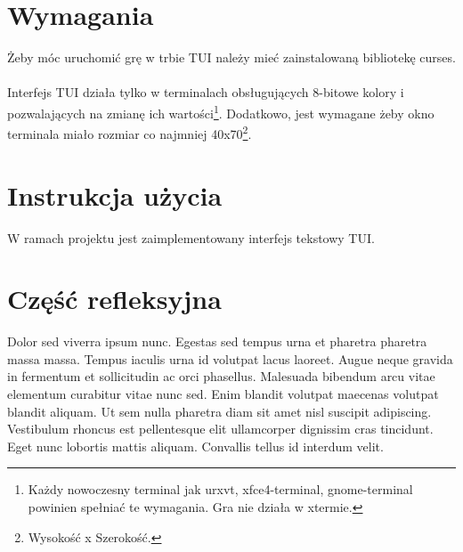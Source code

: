 \documentclass[12pt, titlepage]{article}
\begin{document}
\section{Wymagania}
Żeby móc uruchomić grę w trbie TUI należy mieć zainstalowaną
bibliotekę curses.
\\~\\
Interfejs TUI działa tylko w terminalach obsługujących 8-bitowe
kolory i pozwalających na zmianę ich wartości\footnote{Każdy nowoczesny terminal jak urxvt, xfce4-terminal, gnome-terminal powinien spełniać te wymagania. Gra nie działa w xtermie.}.
Dodatkowo, jest wymagane żeby okno terminala miało rozmiar co
najmniej 40x70\footnote{Wysokość x Szerokość.}.

\section{Instrukcja użycia}
W ramach projektu jest zaimplementowany interfejs tekstowy TUI.


\section{Część refleksyjna}
Dolor sed viverra ipsum nunc. Egestas sed tempus urna et pharetra pharetra massa massa. Tempus iaculis urna id volutpat lacus laoreet. Augue neque gravida in fermentum et sollicitudin ac orci phasellus. Malesuada bibendum arcu vitae elementum curabitur vitae nunc sed. Enim blandit volutpat maecenas volutpat blandit aliquam. Ut sem nulla pharetra diam sit amet nisl suscipit adipiscing. Vestibulum rhoncus est pellentesque elit ullamcorper dignissim cras tincidunt. Eget nunc lobortis mattis aliquam. Convallis tellus id interdum velit.
\end{document}
